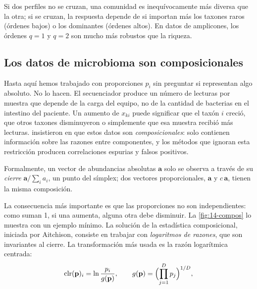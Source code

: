 Si dos perfiles no se cruzan, una comunidad es inequívocamente más diversa que la otra; si se cruzan, la respuesta depende de si importan más los taxones raros (órdenes bajos) o los dominantes (órdenes altos). En datos de amplicones, los órdenes $q=1$ y $q=2$ son mucho más robustos que la riqueza.

\subsection{Los datos de microbioma son composicionales}

Hasta aquí hemos trabajado con proporciones $p_i$ sin preguntar si representan algo absoluto. No lo hacen. El secuenciador produce un número de lecturas por muestra que depende de la carga del equipo, no de la cantidad de bacterias en el intestino del paciente. Un aumento de $x_{ki}$ puede significar que el taxón $i$ creció, que otros taxones disminuyeron o simplemente que esa muestra recibió más lecturas. \textcite{c14-gloor2017} insistieron en que estos datos son \emph{composicionales}: solo contienen información sobre las razones entre componentes, y los métodos que ignoran esta restricción producen correlaciones espurias y falsos positivos.

Formalmente, un vector de abundancias absolutas $\mathbf{a}$ solo se observa a través de su \emph{cierre} $\mathbf{a}/\sum_i a_i$, un punto del símplex; dos vectores proporcionales, $\mathbf{a}$ y $c\,\mathbf{a}$, tienen la misma composición.

La consecuencia más importante es que las proporciones no son independientes: como suman 1, si una aumenta, alguna otra debe disminuir. La \cref{fig:14-compos} lo muestra con un ejemplo mínimo. La solución de la estadística composicional, iniciada por Aitchison, consiste en trabajar con \emph{logaritmos de razones}, que son invariantes al cierre. La transformación más usada es la razón logarítmica centrada:
\begin{equation}\label{eq:14-clr}
\operatorname{clr}(\mathbf{p})_i = \ln\frac{p_i}{g(\mathbf{p})}, \qquad g(\mathbf{p}) = \Bigl(\prod_{j=1}^{D} p_j\Bigr)^{1/D},
\end{equation}

\begin{simbolos}
\end{simbolos}

